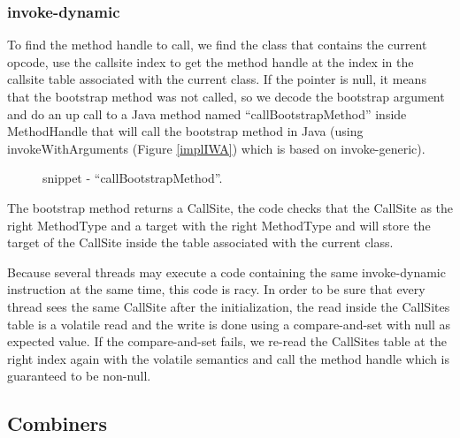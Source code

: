 \documentclass{sig-alternate}
\begin{document}
    \subsubsection{invoke-dynamic}
      To find the method handle to call, we find the class that contains the current opcode,
      use the callsite index to get the method handle at the index
      in the callsite table associated with the current class.
      If the pointer is null, it means that the bootstrap method was not called,
      so we decode the bootstrap argument and do an up call to a Java method named ``callBootstrapMethod'' %
      inside MethodHandle that will call the bootstrap method in Java (using invokeWithArguments (Figure \ref{implIWA})
      which is based on invoke-generic).
      
      \begin{figure}[!h]
        \centering \vspace{-1.5em}
        \caption{snippet - ``callBootstrapMethod''.}\vspace{-1em}
        \label{implBSM}
      \end{figure}

      The bootstrap method returns a CallSite, the code checks that the CallSite as the right MethodType
      and a target with the right MethodType and will store the target of the CallSite inside the table
      associated with the current class.

      Because several threads may execute a code containing the same invoke-dynamic instruction
      at the same time, this code is racy. In order to be sure that every thread sees the same CallSite
      after the initialization, the read inside the CallSites table is a volatile read and the write
      is done using a compare-and-set with null as expected value.
      If the compare-and-set fails, we re-read the CallSites table at the right index again with the volatile semantics
      and call the method handle which is guaranteed to be non-null.   



    \subsection{Combiners}
    \label{combiners}
\end{document}
